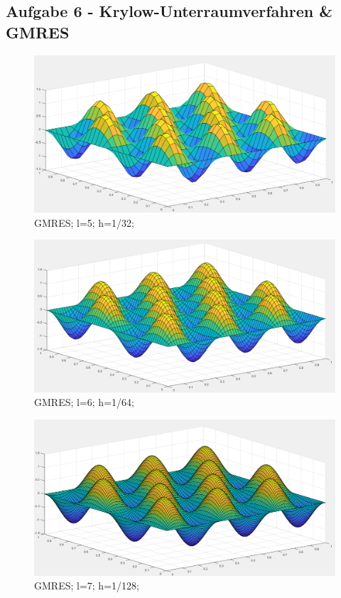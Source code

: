 \documentclass{report}
\begin{document}
\subsection{Aufgabe 6 - Krylow-Unterraumverfahren \& GMRES}
\begin{figure}
	\includegraphics[width=\linewidth]{Aufgaben-Ressourcen/A6L5M3N2.png} 
		\caption{GMRES; l=5; h=1/32;}
		\label{A6L5}
\end{figure}
\begin{figure}
	\includegraphics[width=\linewidth]{Aufgaben-Ressourcen/A6L6M3N2.png} 
		\caption{GMRES; l=6; h=1/64;}
		\label{A6L6}
\end{figure}
\begin{figure}
	\includegraphics[width=\linewidth]{Aufgaben-Ressourcen/A6L7M3N2.png}
		\caption{GMRES; l=7; h=1/128;}
		\label{A6L7}
\end{figure}
\end{document}
